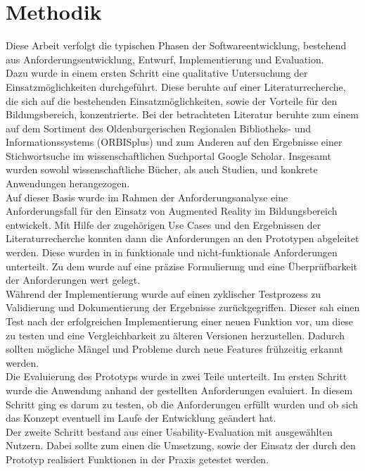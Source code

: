 \section{Methodik}
Diese Arbeit verfolgt die typischen Phasen der Softwareentwicklung, bestehend aus Anforderungsentwicklung, Entwurf, Implementierung und Evaluation.\\
Dazu wurde in einem ersten Schritt eine qualitative Untersuchung der Einsatzmöglichkeiten durchgeführt. 
Diese beruhte auf einer Literaturrecherche, die sich auf die bestehenden Einsatzmöglichkeiten, sowie der Vorteile für den Bildungsbereich, konzentrierte. Bei der betrachteten Literatur beruhte zum einem auf dem Sortiment des \glqq Oldenburgerischen Regionalen Bibliotheks- und Informationssystems (ORBISplus)\grqq{} und zum Anderen auf den Ergebnisse einer Stichwortsuche im wissenschaftlichen Suchportal Google Scholar. 
Insgesamt wurden sowohl wissenschaftliche Bücher, als auch Studien, und konkrete Anwendungen herangezogen.\\
Auf dieser Basis wurde im Rahmen der Anforderungsanalyse eine Anforderungsfall für den Einsatz von Augmented Reality im Bildungsbereich entwickelt. Mit Hilfe der zugehörigen Use Cases und den Ergebnissen der Literaturrecherche konnten dann die Anforderungen an den Prototypen abgeleitet werden. Diese wurden in in funktionale und nicht-funktionale Anforderungen unterteilt. Zu dem wurde auf eine präzise Formulierung und eine Überprüfbarkeit der Anforderungen wert gelegt.\\
Während der Implementierung wurde auf einen zyklischer Testprozess zu Validierung und Dokumentierung der Ergebnisse zurückgegriffen. Dieser sah einen Test nach der erfolgreichen Implementierung einer neuen Funktion vor, um diese zu testen und eine Vergleichbarkeit zu älteren Versionen herzustellen. Dadurch sollten mögliche Mängel und Probleme durch neue Features frühzeitig erkannt werden. \\
Die Evaluierung des Prototyps wurde in zwei Teile unterteilt. Im ersten Schritt wurde die Anwendung anhand der gestellten Anforderungen evaluiert. In diesem Schritt ging es darum zu testen, ob die Anforderungen erfüllt wurden und ob sich das Konzept eventuell im Laufe der Entwicklung geändert hat. \\
Der zweite Schritt bestand aus einer Usability-Evaluation mit ausgewählten Nutzern. Dabei sollte zum einen die Umsetzung, sowie der Einsatz der durch den Prototyp realisiert Funktionen in der Praxis getestet werden. 

